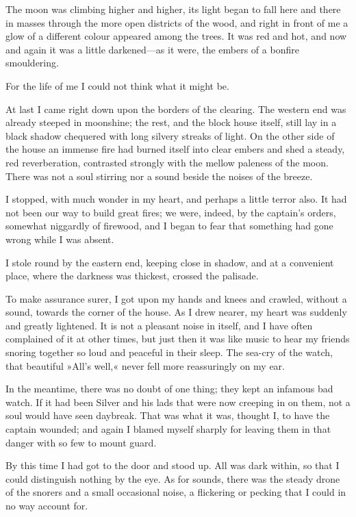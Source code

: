 The moon was climbing higher and higher, its light began to fall here and there in masses through the more open districts of the wood, and right in front of me a glow of a different colour appeared among the trees. It was red and hot, and now and again it was a little darkened—as it were, the embers of a bonfire smouldering.

For the life of me I could not think what it might be.

At last I came right down upon the borders of the clearing. The western end was already steeped in moonshine; the rest, and the block house itself, still lay in a black shadow chequered with long silvery streaks of light. On the other side of the house an immense fire had burned itself into clear embers and shed a steady, red reverberation, contrasted strongly with the mellow paleness of the moon. There was not a soul stirring nor a sound beside the noises of the breeze.

I stopped, with much wonder in my heart, and perhaps a little terror also. It had not been our way to build great fires; we were, indeed, by the captain's orders, somewhat niggardly of firewood, and I began to fear that something had gone wrong while I was absent.

I stole round by the eastern end, keeping close in shadow, and at a convenient place, where the darkness was thickest, crossed the palisade.

To make assurance surer, I got upon my hands and knees and crawled, without a sound, towards the corner of the house. As I drew nearer, my heart was suddenly and greatly lightened. It is not a pleasant noise in itself, and I have often complained of it at other times, but just then it was like music to hear my friends snoring together so loud and peaceful in their sleep. The sea-cry of the watch, that beautiful »All's well,« never fell more reassuringly on my ear.

In the meantime, there was no doubt of one thing; they kept an infamous bad watch. If it had been Silver and his lads that were now creeping in on them, not a soul would have seen daybreak. That was what it was, thought I, to have the captain wounded; and again I blamed myself sharply for leaving them in that danger with so few to mount guard.

By this time I had got to the door and stood up. All was dark within, so that I could distinguish nothing by the eye. As for sounds, there was the steady drone of the snorers and a small occasional noise, a flickering or pecking that I could in no way account for.


